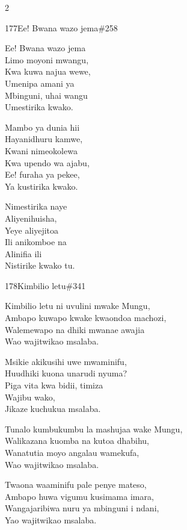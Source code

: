 \begin{multicols}{2}
\begin{hymn}{177}{Ee! Bwana wazo jema}{\#258}
\begin{stanza}
Ee! Bwana wazo jema\\
Limo moyoni mwangu,\\
Kwa kuwa najua wewe,\\
Umenipa amani ya\\
Mbinguni, uhai wangu\\
Umestirika kwako.
\end{stanza}
\begin{stanza}
Mambo ya dunia hii\\
Hayanidhuru kamwe,\\
Kwani nimeokolewa\\
Kwa upendo wa ajabu,\\
Ee! furaha ya pekee,\\
Ya kustirika kwako.
\end{stanza}
\begin{stanza}
Nimestirika naye\\
Aliyenihuisha,\\
Yeye aliyejitoa\\
Ili anikomboe na\\
Alinifia ili\\
Nistirike kwako tu.
\end{stanza}
\end{hymn}

\begin{hymn}{178}{Kimbilio letu}{\#341}
\begin{stanza}
Kimbilio letu ni uvulini mwake Mungu,\\
Ambapo kuwapo kwake kwaondoa machozi,\\
Walemewapo na dhiki mwanae awajia\\
Wao wajitwikao msalaba.
\end{stanza}
\begin{chorus}
Msikie akikusihi uwe mwaminifu,\\
Huudhiki kuona unarudi nyuma?\\
Piga vita kwa bidii, timiza\\
Wajibu wako,\\
Jikaze kuchukua msalaba.
\end{chorus}
\begin{stanza}
Tunalo kumbukumbu la mashujaa wake Mungu,\\
Walikazana kuomba na kutoa dhabihu,\\
Wanatutia moyo angalau wamekufa,\\
Wao wajitwikao msalaba.
\end{stanza}
\begin{stanza}
Twaona waaminifu pale penye mateso,\\
Ambapo huwa vigumu kusimama imara,\\
Wangajaribiwa nuru ya mbinguni i ndani,\\
Yao wajitwikao msalaba.
\end{stanza}
\end{hymn}


\end{multicols}

